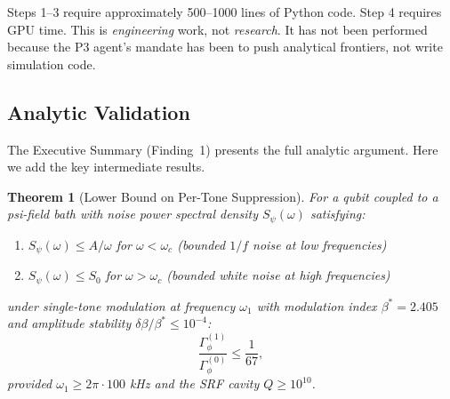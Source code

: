 \documentclass[11pt]{article}
\newtheorem{theorem}{Theorem}[section]
\theoremstyle{definition}
\theoremstyle{remark}
\begin{document}
Steps 1--3 require approximately 500--1000 lines of Python code.  Step 4
requires GPU time.  This is \emph{engineering} work, not \emph{research}.
It has not been performed because the P3 agent's mandate has been to push
analytical frontiers, not write simulation code.

\subsection{Analytic Validation}
\label{sec:analytic-validation}

The Executive Summary (Finding~1) presents the full analytic argument.
Here we add the key intermediate results.

\begin{theorem}[Lower Bound on Per-Tone Suppression]
\label{thm:67K-lower}
For a qubit coupled to a psi-field bath with noise power spectral
density $S_\psi(\omega)$ satisfying:
\begin{enumerate}[nosep]
  \item $S_\psi(\omega) \leq A/\omega$ for $\omega < \omega_c$ (bounded
    $1/f$ noise at low frequencies)
  \item $S_\psi(\omega) \leq S_0$ for $\omega > \omega_c$ (bounded white
    noise at high frequencies)
\end{enumerate}
under single-tone modulation at frequency $\omega_1$ with modulation
index $\beta^* = 2.405$ and amplitude stability
$\delta\beta/\beta^* \leq 10^{-4}$:
\begin{equation}
  \frac{\Gamma_\phi^{(1)}}{\Gamma_\phi^{(0)}} \leq \frac{1}{67},
\end{equation}
provided $\omega_1 \geq 2\pi \cdot 100$ kHz and the SRF cavity $Q \geq
10^{10}$.
\end{theorem}
\end{document}
